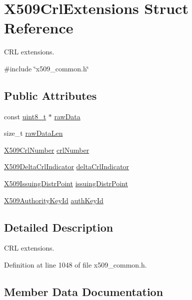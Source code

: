 \hypertarget{structX509CrlExtensions}{}\section{X509\+Crl\+Extensions Struct Reference}
\label{structX509CrlExtensions}


C\+RL extensions.  




{\ttfamily \#include \char`\"{}x509\+\_\+common.\+h\char`\"{}}

\subsection*{Public Attributes}
\begin{DoxyCompactItemize}
\item 
const \hyperlink{stdint_8h_aba7bc1797add20fe3efdf37ced1182c5}{uint8\+\_\+t} $\ast$ \hyperlink{structX509CrlExtensions_a521e89220625fa3e60676d3e47e562fd}{raw\+Data}
\item 
size\+\_\+t \hyperlink{structX509CrlExtensions_ae998f5bcf83a5ef274ff191bbefd20c8}{raw\+Data\+Len}
\item 
\hyperlink{structX509CrlNumber}{X509\+Crl\+Number} \hyperlink{structX509CrlExtensions_a1c4443888eafec771d558ee4485ffcb7}{crl\+Number}
\item 
\hyperlink{structX509DeltaCrlIndicator}{X509\+Delta\+Crl\+Indicator} \hyperlink{structX509CrlExtensions_adfaf2ba762fb10d96abd445936f6fb58}{delta\+Crl\+Indicator}
\item 
\hyperlink{structX509IssuingDistrPoint}{X509\+Issuing\+Distr\+Point} \hyperlink{structX509CrlExtensions_a7257319dbcfa75fe2671c04d6af33b20}{issuing\+Distr\+Point}
\item 
\hyperlink{structX509AuthorityKeyId}{X509\+Authority\+Key\+Id} \hyperlink{structX509CrlExtensions_a73c935fb8c6d58c20de34b1dfb8cbfcd}{auth\+Key\+Id}
\end{DoxyCompactItemize}


\subsection{Detailed Description}
C\+RL extensions. 

Definition at line 1048 of file x509\+\_\+common.\+h.



\subsection{Member Data Documentation}
\mbox{\label{structX509CrlExtensions_a73c935fb8c6d58c20de34b1dfb8cbfcd}} 
